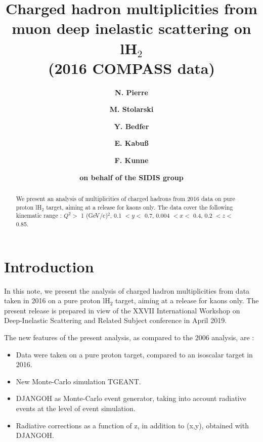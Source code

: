 \documentclass[letterpaper,12pt]{article}
\begin{document}
\title{\textbf{Charged hadron multiplicities from muon deep inelastic scattering on lH$_2$ \\ (2016 COMPASS data)}}
\author[1,2]{\textbf{N. Pierre}}
\author[3]{\textbf{M. Stolarski}}
\author[1]{\textbf{Y. Bedfer}}
\author[2]{\textbf{E. Kabu{\ss}}}
\author[1]{\textbf{F. Kunne}}
\author[ ]{\textbf{on behalf of the SIDIS group}}

\maketitle

\begin{abstract}
  We present an analysis of multiplicities of charged hadrons from 2016 data on pure proton lH$_2$ target, aiming at a release for kaons only.
  The data cover the following kinematic range : $Q^2 >$ 1 (GeV/c)$^2$, 0.1 $< y <$ 0.7, 0.004 $< x <$ 0.4,
  0.2 $< z <$ 0.85.
\end{abstract}

\newpage

\section{Introduction} \label{Intro}

In this note, we present the analysis of charged hadron multiplicities from data taken in 2016 on a pure proton lH$_2$ target, aiming at a release for kaons only.
The present release is prepared in view of the XXVII International Workshop on Deep-Inelastic Scattering and Related Subject conference in April 2019.

The new features of the present analysis, as compared to the 2006 analysis\cite{COMPASS2006P,COMPASS2006K}, are :
\begin{itemize}
	\item Data were taken on a pure proton target, compared to an isoscalar target in 2016.
	\item New Monte-Carlo simulation TGEANT.
	\item DJANGOH as Monte-Carlo event generator, taking into account radiative events at the level of event simulation\cite{DJANGOH_NOTE}.
	\item Radiative corrections as a function of z, in addition to (x,y), obtained with DJANGOH.
\end{itemize}
\end{document}

